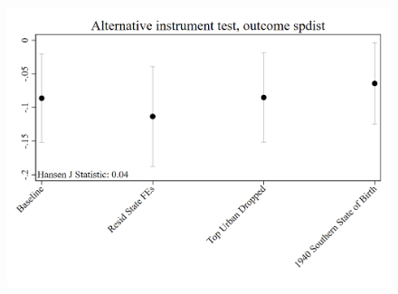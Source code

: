 \documentclass{article}
\begin{document}
\clearpage
\begin{figure}
	\centering
	\includegraphics[width=.8\textwidth]{figures/exogeneity_tests/D16_alt_inst_pooled_spdist_urban.png}
\end{figure}
\clearpage
\end{document}
